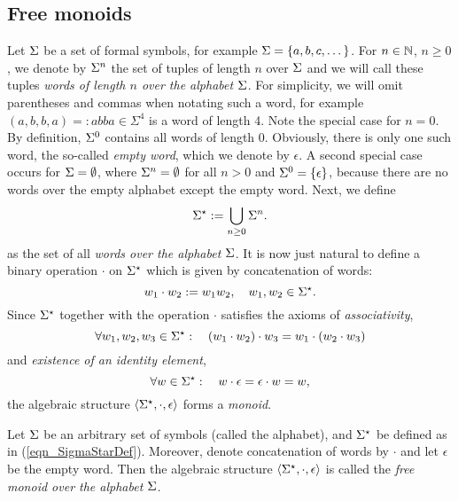 \subsection{Free monoids}
Let $\Sigma$ be a set of formal symbols, for example $\Sigma = \{a, b, c, \dots\}$. For $n \in \mathbb{N}$, $n \ge 0$, we denote by $\Sigma^n$ the set of tuples of length $n$ over $\Sigma$ and we will call these tuples \emph{words of length $n$ over the alphabet $\Sigma$}. For simplicity, we will omit parentheses and commas when notating such a word, for example $(a,b,b,a) =: abba \in \Sigma^4$ is a word of length 4. Note the special case for $n = 0$. By definition, $\Sigma^0$ contains all words of length $0$. Obviously, there is only one such word, the so-called \emph{empty word}, which we denote by $\epsilon$. A second special case occurs for $\Sigma = \emptyset$, where $\Sigma^n = \emptyset$ for all $n > 0$ and $\Sigma^0 = \{\epsilon\}$, because there are no words over the empty alphabet except the empty word. Next, we define 
\begin{equation}
\label{eqn_SigmaStarDef}
{\Sigma}^{\star} := \bigcup_{n \ge 0} \Sigma^n.
\end{equation}
as the set of all \emph{words over the alphabet $\Sigma$}. It is now just natural to define a binary operation $\cdot$ on ${\Sigma}^{\star}$ which is given by concatenation of words:
\begin{equation*}
w_1 \cdot w_2 := w_1 w_2, \quad w_1, w_2 \in {\Sigma}^{\star}.
\end{equation*}
Since ${\Sigma}^{\star}$ together with the operation $\cdot$ satisfies the axioms of \emph{associativity},
\begin{equation*}
\forall w_1,w_2,w_3 \in {\Sigma}^{\star}:\quad (w_1 \cdot w_2) \cdot w_3 = w_1 \cdot (w_2 \cdot w_3)
\end{equation*}
and \emph{existence of an identity element},
\begin{equation*}
\forall w \in {\Sigma}^{\star}:\quad w \cdot  \epsilon = \epsilon \cdot w = w,
\end{equation*}
the algebraic structure $\langle {\Sigma}^{\star}, \cdot, \epsilon \rangle$ forms a \emph{monoid}.

\begin{definition}
\label{dfn_FreeMonoid}
Let $\Sigma$ be an arbitrary set of symbols (called the alphabet), and ${\Sigma}^{\star}$ be defined as in (\ref{eqn_SigmaStarDef}). Moreover, denote concatenation of words by $\cdot$ and let $\epsilon$ be the empty word. Then the algebraic structure $\langle {\Sigma}^{\star}, \cdot, \epsilon \rangle$ is called the \emph{free monoid over the alphabet $\Sigma$}.
\end{definition} 

